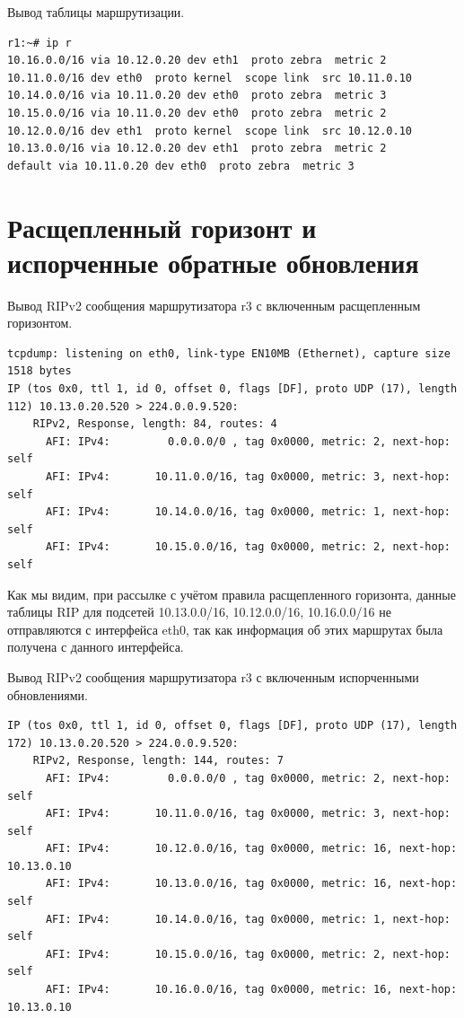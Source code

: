 \documentclass[a4paper,12pt]{article}
\begin{document}
Вывод таблицы маршрутизации.

\begin{Verbatim}
r1:~# ip r
10.16.0.0/16 via 10.12.0.20 dev eth1  proto zebra  metric 2 
10.11.0.0/16 dev eth0  proto kernel  scope link  src 10.11.0.10 
10.14.0.0/16 via 10.11.0.20 dev eth0  proto zebra  metric 3 
10.15.0.0/16 via 10.11.0.20 dev eth0  proto zebra  metric 2 
10.12.0.0/16 dev eth1  proto kernel  scope link  src 10.12.0.10 
10.13.0.0/16 via 10.12.0.20 dev eth1  proto zebra  metric 2 
default via 10.11.0.20 dev eth0  proto zebra  metric 3
\end{Verbatim}

\section{Расщепленный горизонт и испорченные обратные обновления}

Вывод RIPv2 сообщения маршрутизатора r3 с включенным расщепленным горизонтом.

\begin{Verbatim}
tcpdump: listening on eth0, link-type EN10MB (Ethernet), capture size 1518 bytes
IP (tos 0x0, ttl 1, id 0, offset 0, flags [DF], proto UDP (17), length 112) 10.13.0.20.520 > 224.0.0.9.520: 
	RIPv2, Response, length: 84, routes: 4
	  AFI: IPv4:         0.0.0.0/0 , tag 0x0000, metric: 2, next-hop: self
	  AFI: IPv4:       10.11.0.0/16, tag 0x0000, metric: 3, next-hop: self
	  AFI: IPv4:       10.14.0.0/16, tag 0x0000, metric: 1, next-hop: self
	  AFI: IPv4:       10.15.0.0/16, tag 0x0000, metric: 2, next-hop: self
\end{Verbatim}

Как мы видим, при рассылке с учётом правила расщепленного горизонта, данные таблицы RIP для подсетей 10.13.0.0/16, 10.12.0.0/16, 10.16.0.0/16 не отправляются с интерфейса eth0, так как информация об этих маршрутах была получена с данного интерфейса. 


Вывод RIPv2 сообщения маршрутизатора r3 с включенным испорченными обновлениями.

\begin{Verbatim}
IP (tos 0x0, ttl 1, id 0, offset 0, flags [DF], proto UDP (17), length 172) 10.13.0.20.520 > 224.0.0.9.520: 
	RIPv2, Response, length: 144, routes: 7
	  AFI: IPv4:         0.0.0.0/0 , tag 0x0000, metric: 2, next-hop: self
	  AFI: IPv4:       10.11.0.0/16, tag 0x0000, metric: 3, next-hop: self
	  AFI: IPv4:       10.12.0.0/16, tag 0x0000, metric: 16, next-hop: 10.13.0.10
	  AFI: IPv4:       10.13.0.0/16, tag 0x0000, metric: 16, next-hop: self
	  AFI: IPv4:       10.14.0.0/16, tag 0x0000, metric: 1, next-hop: self
	  AFI: IPv4:       10.15.0.0/16, tag 0x0000, metric: 2, next-hop: self
	  AFI: IPv4:       10.16.0.0/16, tag 0x0000, metric: 16, next-hop: 10.13.0.10
\end{Verbatim}
\end{document}
